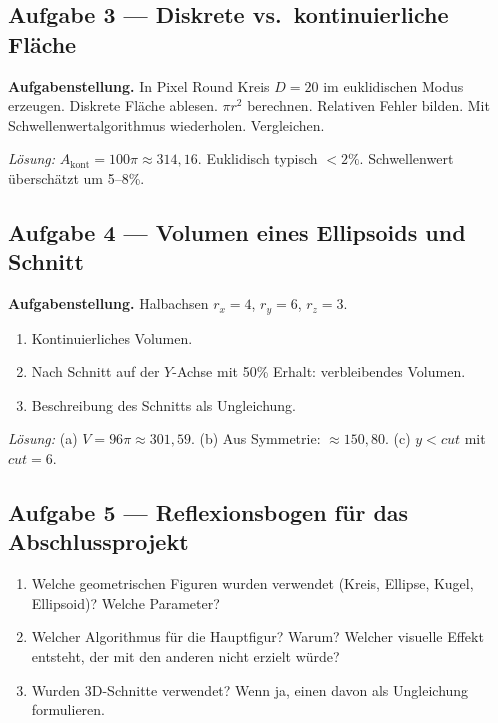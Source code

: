 \documentclass[12pt,a4paper]{scrartcl}
\begin{document}
\subsection*{Aufgabe 3 --- Diskrete vs.\ kontinuierliche Fläche}
\textbf{Aufgabenstellung.} In Pixel Round Kreis $D = 20$ im euklidischen Modus erzeugen. Diskrete Fläche ablesen. $\pi r^2$ berechnen. Relativen Fehler bilden. Mit Schwellenwertalgorithmus wiederholen. Vergleichen.

\emph{Lösung:} $A_{\text{kont}} = 100\pi \approx 314{,}16$. Euklidisch typisch $< 2\%$. Schwellenwert überschätzt um 5--8\%.

\subsection*{Aufgabe 4 --- Volumen eines Ellipsoids und Schnitt}
\textbf{Aufgabenstellung.} Halbachsen $r_x = 4$, $r_y = 6$, $r_z = 3$.
\begin{enumerate}[label=\alph*),leftmargin=1.5em,itemsep=0.1em,topsep=0.2em,nosep]
  \item Kontinuierliches Volumen.
  \item Nach Schnitt auf der $Y$-Achse mit 50\% Erhalt: verbleibendes Volumen.
  \item Beschreibung des Schnitts als Ungleichung.
\end{enumerate}

\emph{Lösung:}
(a) $V = 96\pi \approx 301{,}59$.
(b) Aus Symmetrie: $\approx 150{,}80$.
(c) $y < \mathit{cut}$ mit $\mathit{cut} = 6$.

\subsection*{Aufgabe 5 --- Reflexionsbogen für das Abschlussprojekt}
\begin{enumerate}[label=(\arabic*),leftmargin=1.7em,itemsep=0.15em,topsep=0.2em,nosep]
  \item Welche geometrischen Figuren wurden verwendet (Kreis, Ellipse, Kugel, Ellipsoid)? Welche Parameter?
  \item Welcher Algorithmus für die Hauptfigur? Warum? Welcher visuelle Effekt entsteht, der mit den anderen nicht erzielt würde?
  \item Wurden 3D-Schnitte verwendet? Wenn ja, einen davon als Ungleichung formulieren.
\end{enumerate}

\newpage
\end{document}
